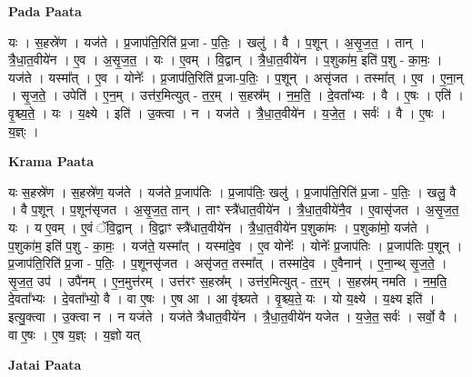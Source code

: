 \documentclass[17pt]{extarticle}
\begin{document}
\textbf{Pada Paata} \newline

यः । स॒हस्रे॑ण । यज॑ते । प्र॒जाप॑ति॒रिति॑ प्र॒जा - प॒तिः॒ । खलु॑ । वै । प॒शून् । अ॒सृ॒ज॒त॒ । तान् । त्रै॒धा॒त॒वीये॑न । ए॒व । अ॒सृ॒ज॒त॒ । यः ।   ए॒वम् । वि॒द्वान् । त्रै॒धा॒त॒वीये॑न । प॒शुका॑म॒ इति॑ प॒शु - का॒मः॒ । यज॑ते । यस्मा᳚त् । ए॒व । योनेः᳚ । प्र॒जाप॑ति॒रिति॑ प्र॒जा-प॒तिः॒ । प॒शून् । असृ॑जत । तस्मा᳚त् । ए॒व । ए॒ना॒न् । सृ॒ज॒ते॒ । उपेति॑ । ए॒न॒म् । उत्त॑र॒मित्युत् - त॒र॒म् । स॒हस्र᳚म् । न॒म॒ति॒ । दे॒वता᳚भ्यः । वै । ए॒षः । एति॑ । वृ॒श्च्य॒ते॒ । यः । य॒क्ष्ये । इति॑ । उ॒क्त्वा । न । यज॑ते । त्रै॒धा॒त॒वीये॑न । य॒जे॒त॒ । सर्वः॑ । वै । ए॒षः । य॒ज्ञ्ः ।  \newline


\textbf{Krama Paata} \newline

यः स॒हस्रे॑ण । स॒हस्रे॑ण॒ यज॑ते । यज॑ते प्र॒जाप॑तिः । प्र॒जाप॑तिः॒ खलु॑ । प्र॒जाप॑ति॒रिति॑ प्र॒जा - प॒तिः॒ । खलु॒ वै । वै प॒शून् । प॒शून॑सृजत । अ॒सृ॒ज॒त॒ तान् । ताꣳ स्त्रै॑धात॒वीये॑न । त्रै॒धा॒त॒वीये॑नै॒व । ए॒वासृ॑जत । अ॒सृ॒ज॒त॒ यः । य ए॒वम् । ए॒वं ॅवि॒द्वान् । वि॒द्वाꣳ स्त्रै॑धात॒वीये॑न । त्रै॒धा॒त॒वीये॑न प॒शुका॑मः । प॒शुका॑मो॒ यज॑ते । प॒शुका॑म॒ इति॑ प॒शु - का॒मः॒ । यज॑ते॒ यस्मा᳚त् । यस्मा॑दे॒व । ए॒व योनेः᳚ । योनेः᳚ प्र॒जाप॑तिः । प्र॒जाप॑तिः प॒शून् । प्र॒जाप॑ति॒रिति॑ प्र॒जा - प॒तिः॒ । प॒शूनसृ॑जत । असृ॑जत॒ तस्मा᳚त् । तस्मा॑दे॒व । ए॒वैनान्॑ । ए॒ना॒न्थ् सृ॒ज॒ते॒ । सृ॒ज॒त॒ उप॑ । उपै॑नम् । ए॒न॒मुत्त॑रम् । उत्त॑रꣳ स॒हस्र᳚म् । उत्त॑र॒मित्युत् - त॒र॒म् । स॒हस्र॑म् नमति । न॒म॒ति॒ दे॒वता᳚भ्यः । दे॒वता᳚भ्यो॒ वै । वा ए॒षः । ए॒ष आ । आ वृ॑श्च्यते । वृ॒श्च्य॒ते॒ यः । यो य॒क्ष्ये । य॒क्ष्य इति॑ । इत्यु॒क्त्वा । उ॒क्त्वा न । न यज॑ते । यज॑ते त्रैधात॒वीये॑न । त्रै॒धा॒त॒वीये॑न यजेत । य॒जे॒त॒ सर्वः॑ । सर्वो॒ वै । वा ए॒षः । ए॒ष य॒ज्ञ्ः । य॒ज्ञो यत् \newline

\textbf{Jatai Paata} \newline
\end{document}
